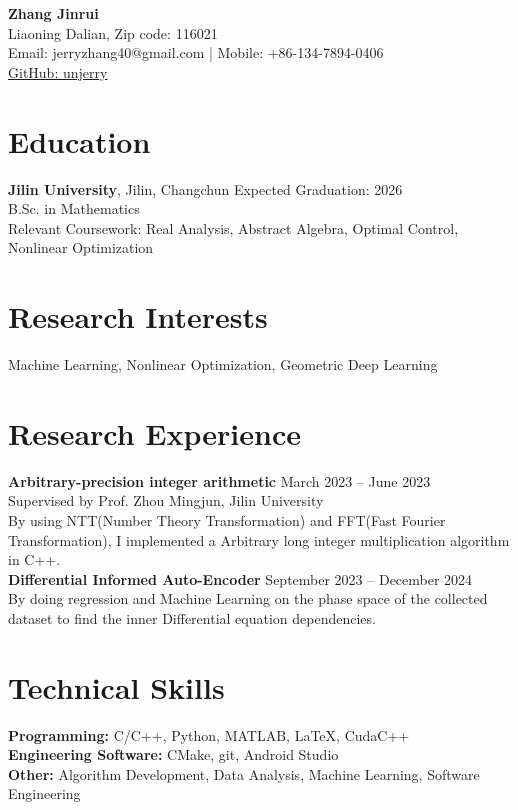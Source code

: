 \documentclass[a4paper,10pt]{article}
\begin{document}
\begin{center}
    {\LARGE \textbf{Zhang Jinrui}}\\
    Liaoning Dalian, Zip code: 116021 \\
    Email: jerryzhang40@gmail.com | Mobile: +86-134-7894-0406 \\
    \href{https://github.com/unjerry}{GitHub: unjerry}
\end{center}

\section*{Education}
\textbf{Jilin University}, Jilin, Changchun  \hfill Expected Graduation: 2026  \\
B.Sc. in Mathematics \\
Relevant Coursework: Real Analysis, Abstract Algebra, Optimal Control, Nonlinear Optimization

\section*{Research Interests}
Machine Learning, Nonlinear Optimization, Geometric Deep Learning

\section*{Research Experience}
\textbf{Arbitrary-precision integer arithmetic} \hfill March 2023 – June 2023  \\
Supervised by Prof. Zhou Mingjun, Jilin University  \\
By using NTT(Number Theory Transformation) and FFT(Fast Fourier Transformation),
I implemented a Arbitrary long integer multiplication algorithm
in C++\cite{firstApproachGithubProject}.
\\
\textbf{Differential Informed Auto-Encoder} \hfill September 2023 – December 2024  \\
By doing regression and Machine Learning on the phase space of
the collected dataset to find the inner Differential
equation dependencies.

\section*{Technical Skills}
\textbf{Programming:} C/C++, Python, MATLAB, LaTeX, CudaC++  \\
\textbf{Engineering Software:} CMake, git, Android Studio \\
\textbf{Other:} Algorithm Development, Data Analysis, Machine Learning, Software Engineering
\end{document}
